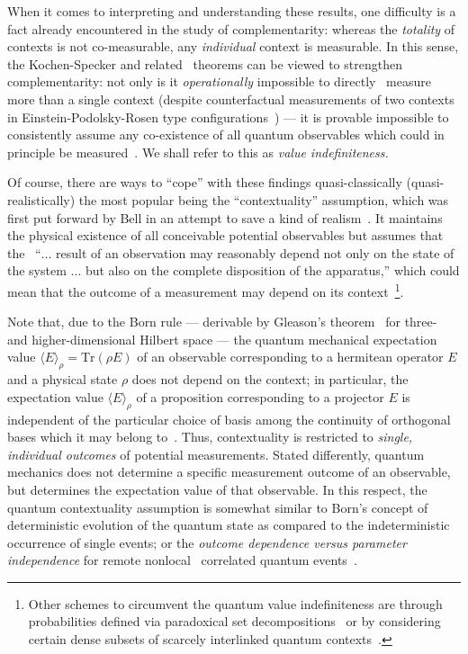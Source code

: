 \documentclass[%
 preprint,
 showpacs,
 showkeys,
 preprintnumbers,
 amsmath,amssymb,
 aps,
 prl,
  longbibliography,
 ]{revtex4-1}
\begin{document}
When it comes to interpreting and understanding these results, one difficulty  is a fact
already encountered in the study of complementarity:
whereas the {\em totality} of contexts is not co-measurable,
any {\em individual} context is measurable.
In this sense,
the Kochen-Specker and related~\cite{ghz,mermin-93}
theorems  can be viewed to strengthen complementarity:  not only
is it {\em operationally} impossible to directly~\cite{svozil-2006-uniquenessprinciple} measure
more than a single context (despite counterfactual measurements of two contexts
in Einstein-Podolsky-Rosen type configurations~\cite{epr,svozil-2006-omni}) ---
it is provable impossible to consistently assume any co-existence of all quantum observables
which could in principle be measured~\cite{peres222}. We shall refer to this as {\em value indefiniteness.}

Of course, there are ways to ``cope'' with these findings quasi-classically (quasi-realistically)
the most popular being the ``contextuality''
assumption, which was first put forward by Bell
in an attempt to save a kind of realism~\cite{bohr-1949,bell-66,hey-red,redhead}.
It maintains the physical existence of all conceivable potential observables but assumes that the~\cite{bell-66}
``$\ldots$
result of an observation may reasonably depend
not only on the state of the system  $\ldots$
but also on the complete disposition  of the apparatus,''
which could mean that the outcome of a measurement may depend on its context~\footnote{Other schemes to circumvent the quantum value indefiniteness are through
probabilities defined via paradoxical set decompositions~\cite{pitowsky-82,pitowsky-83}
or by considering certain dense subsets of scarcely interlinked quantum contexts~\cite{meyer:99}.}.

Note that, due to the Born rule --- derivable by Gleason's theorem~\cite{Gleason,r:dvur-93,pitowsky:218} for three- and higher-dimensional Hilbert space ---
the quantum mechanical expectation value $\langle E\rangle_\rho =\textrm{Tr} \left(\rho E\right)$ of an observable corresponding to a hermitean operator $E$
and a physical state $\rho$
does not depend on the context; in particular,  the expectation value $\langle E\rangle_\rho$  of a proposition corresponding to a projector $E$
is independent of the particular choice of basis among the continuity of orthogonal bases which it may belong to~\cite{svozil:040102}.
Thus, contextuality is restricted to {\em single, individual outcomes} of potential measurements.
Stated differently, quantum mechanics does not determine a specific measurement outcome of an observable,
but  determines the expectation value of that observable.
In this respect, the quantum contextuality assumption is somewhat similar to Born's concept of deterministic evolution of the quantum state as compared to the
indeterministic occurrence of single events; or the {\em outcome dependence {\it versus} parameter independence}
for remote nonlocal~\cite{wjswz-98} correlated quantum events~\cite{shimony2}.
\end{document}
